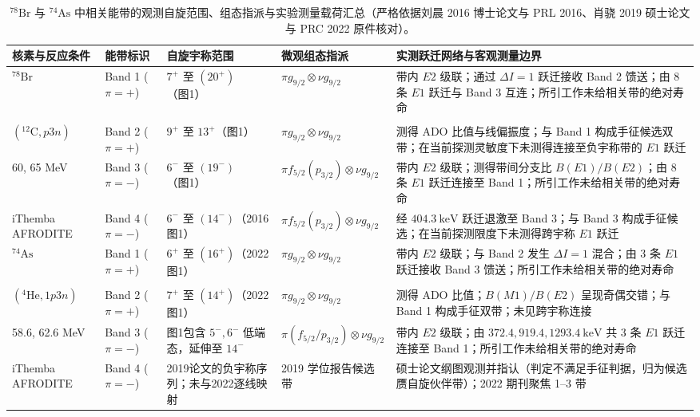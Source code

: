 \begin{table}[!htbp]
\centering
\footnotesize
\caption{$^{78}\mathrm{Br}$ 与 $^{74}\mathrm{As}$ 中相关能带的观测自旋范围、组态指派与实验测量载荷汇总（严格依据刘晨 2016 博士论文与 PRL 2016、肖骁 2019 硕士论文与 PRC 2022 原件核对）。}\label{tab:4-5-bands-summary}
\begin{tabularx}{\textwidth}{p{2.0cm}p{1.6cm}p{1.9cm}p{3.0cm}>{\raggedright\arraybackslash}X}
\hline\hline
核素与反应条件 & 能带标识 & 自旋宇称范围 & 微观组态指派 & 实测跃迁网络与客观测量边界 \\
\hline
$^{78}\mathrm{Br}$ & Band 1 ($\pi=+$) & $7^+$ 至 $(20^+)$（图1） & $\pi g_{9/2} \otimes \nu g_{9/2}$ & 带内 $E2$ 级联；通过 $\Delta I=1$ 跃迁接收 Band 2 馈送；由 8 条 $E1$ 跃迁与 Band 3 互连；所引工作未给相关带的绝对寿命 \\
\shortstack[l]{$^{70}\mathrm{Zn}$\\$(^{12}\mathrm{C}, p3n)$} & Band 2 ($\pi=+$) & $9^+$ 至 $13^+$（图1） & $\pi g_{9/2} \otimes \nu g_{9/2}$ & 测得 ADO 比值与线偏振度；与 Band 1 构成手征候选双带；在当前探测灵敏度下未测得连接至负宇称带的 $E1$ 跃迁 \\
60, 65 MeV & Band 3 ($\pi=-$) & $6^-$ 至 $(19^-)$（图1） & $\pi f_{5/2}(p_{3/2}) \otimes \nu g_{9/2}$ & 带内 $E2$ 级联；测得带间分支比 $B(E1)/B(E2)$；由 8 条 $E1$ 跃迁连接至 Band 1；所引工作未给相关带的绝对寿命 \\
iThemba AFRODITE & Band 4 ($\pi=-$) & $6^-$ 至 $(14^-)$（2016图1） & $\pi f_{5/2}(p_{3/2}) \otimes \nu g_{9/2}$ & 经 $404.3\ \mathrm{keV}$ 跃迁退激至 Band 3；与 Band 3 构成手征候选；在当前探测限度下未测得跨宇称 $E1$ 跃迁 \\
\hline
$^{74}\mathrm{As}$ & Band 1 ($\pi=+$) & $6^+$ 至 $(16^+)$（2022图1） & $\pi g_{9/2} \otimes \nu g_{9/2}$ & 带内 $E2$ 级联；与 Band 2 发生 $\Delta I=1$ 混合；由 3 条 $E1$ 跃迁接收 Band 3 馈送；所引工作未给相关带的绝对寿命 \\
\shortstack[l]{$^{74}\mathrm{Ge}$\\$(^4\mathrm{He}, 1p3n)$} & Band 2 ($\pi=+$) & $7^+$ 至 $(14^+)$（2022图1） & $\pi g_{9/2} \otimes \nu g_{9/2}$ & 测得 ADO 比值；$B(M1)/B(E2)$ 呈现奇偶交错；与 Band 1 构成手征双带；未见跨宇称连接 \\
58.6, 62.6 MeV & Band 3 ($\pi=-$) & 图1包含 $5^-,6^-$ 低端态，延伸至 $14^-$ & $\pi(f_{5/2}/p_{3/2}) \otimes \nu g_{9/2}$ & 带内 $E2$ 级联；由 $372.4, 919.4, 1293.4\ \mathrm{keV}$ 共 3 条 $E1$ 跃迁连接至 Band 1；所引工作未给相关带的绝对寿命 \\
iThemba AFRODITE & Band 4 ($\pi=-$) & 2019论文的负宇称序列；未与2022逐线映射 & 2019 学位报告候选带 & 2019 硕士论文纲图观测并指认（判定不满足手征判据，归为候选赝自旋伙伴带）；2022 期刊聚焦 1--3 带 \\
\hline\hline
\end{tabularx}
\end{table}

